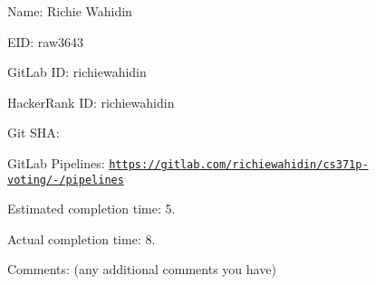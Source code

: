 
\begin{DoxyItemize}
\item Name\+: Richie Wahidin
\item E\+ID\+: raw3643
\item Git\+Lab ID\+: richiewahidin
\item Hacker\+Rank ID\+: richiewahidin
\item Git S\+HA\+:
\item Git\+Lab Pipelines\+: \href{https://gitlab.com/richiewahidin/cs371p-voting/-/pipelines}{\tt https\+://gitlab.\+com/richiewahidin/cs371p-\/voting/-\//pipelines}
\item Estimated completion time\+: 5.
\item Actual completion time\+: 8.
\item Comments\+: (any additional comments you have) 
\end{DoxyItemize}